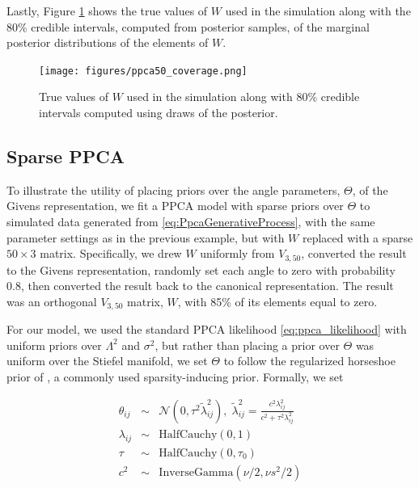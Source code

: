 \documentclass[ba]{imsart}
\numberwithin{equation}{section}
\theoremstyle{plain}
\begin{document}
\noindent Lastly, Figure \ref{fig:ppca50_coverage} shows the true values of $W$ used in the simulation along with the 80\% credible intervals, computed from posterior samples, of the marginal posterior distributions of the elements of $W$. 

\begin{figure}[h]
\centering
\vspace{.1in}
\texttt{[image: figures/ppca50\_coverage.png]}
\vspace{.05in}
\caption{True values of $W$ used in the simulation along with 80\% credible intervals computed using draws of the posterior.}
\label{fig:ppca50_coverage}
\end{figure}


\subsection{Sparse PPCA}
To illustrate the utility of placing priors over the angle parameters, $\Theta$, of the Givens representation, we fit a PPCA model with sparse priors over $\Theta$ to simulated data generated from \ref{eq:PpcaGenerativeProcess}, with the same parameter settings as in the previous example, but with $W$ replaced with a sparse $50 \times 3$ matrix. Specifically, we drew $W$ uniformly from $V_{3,50}$, converted the result to the Givens representation, randomly set each angle to zero with probability 0.8, then converted the result back to the canonical representation. The result was an orthogonal $V_{3,50}$ matrix, $W$, with 85\% of its elements equal to zero.

\noindent For our model, we used the standard PPCA likelihood \ref{eq:ppca_likelihood} with uniform priors over $\Lambda^2$ and $\sigma^2$, but rather than placing a prior over $\Theta$ was uniform over the Stiefel manifold, we set $\Theta$ to follow the regularized horseshoe prior of \cite{piironen2017sparsity}, a commonly used sparsity-inducing prior. Formally, we set

\begin{eqnarray}
\theta_{ij} &\sim& \mathcal{N}(0, \tau^2 \tilde{\lambda}_{ij}^2),\; \tilde{\lambda}_{ij}^2 = \frac{c^2 \lambda_{ij}^2}{c^2 + \tau^2 \lambda_{ij}^2}\\
\lambda_{ij} &\sim& \mathrm{Half Cauchy}(0,1)\nonumber \\
\tau &\sim& \mathrm{Half Cauchy}(0,\tau_0)\nonumber \\
c^2 &\sim& \mathrm{Inverse Gamma}(\nu/2, \nu s^2/2)\nonumber
\end{eqnarray}
\end{document}
